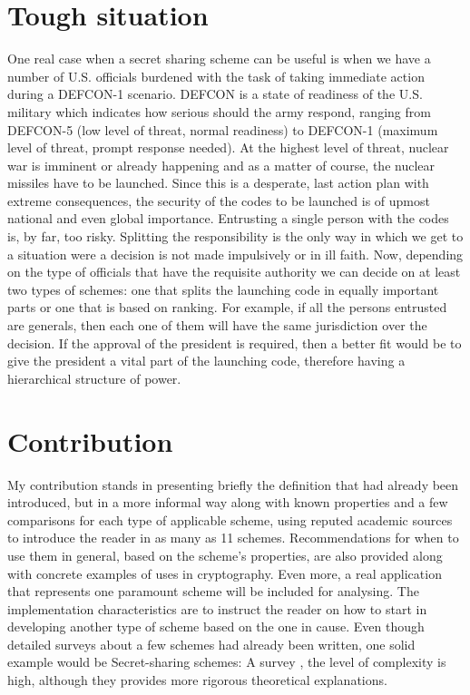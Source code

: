 \documentclass[12pt, a4paper, oneside]{book}
\begin{document}
    \section{Tough situation}
    One real case when a secret sharing scheme can be useful is when we have a number of U.S. officials burdened with the task of taking immediate action during a DEFCON-1 scenario. DEFCON is a state of readiness of the U.S. military which indicates how serious should the army respond, ranging from DEFCON-5 (low level of threat, normal readiness) to DEFCON-1 (maximum level of threat, prompt response needed). At the highest level of threat, nuclear war is imminent or already happening and as a matter of course, the nuclear missiles have to be launched. Since this is a desperate, last action plan with extreme consequences, the security of the codes to be launched is of upmost national and even global importance. Entrusting a single person with the codes is, by far, too risky. Splitting the responsibility is the only way in which we get to a situation were a decision is not made impulsively or in ill faith. Now, depending on the type of officials that have the requisite authority we can decide on at least two types of schemes: one that splits the launching code in equally important parts or one that is based on ranking. For example, if all the persons entrusted are generals, then each one of them will have the same jurisdiction over the decision. If the approval of the president is required, then a better fit would be to give the president a vital part of the launching code, therefore having a hierarchical structure of power.
    \section{Contribution} My contribution stands in presenting briefly the definition that had already been introduced, but in a more informal way along with known properties and a few comparisons for each type of applicable scheme, using reputed academic sources to introduce the reader in as many as 11 schemes. Recommendations for when to use them in general, based on the scheme's properties, are also provided along with concrete examples of uses in cryptography. Even more, a real application that represents one paramount scheme will be included for analysing. The implementation characteristics are to instruct the reader on how to start in developing another type of scheme based on the one in cause. Even though detailed surveys about a few schemes had already been written, one solid example would be Secret-sharing schemes: A survey \cite{SecretSurveyB}, the level of complexity is high, although they provides more rigorous theoretical explanations. 
\end{document}
